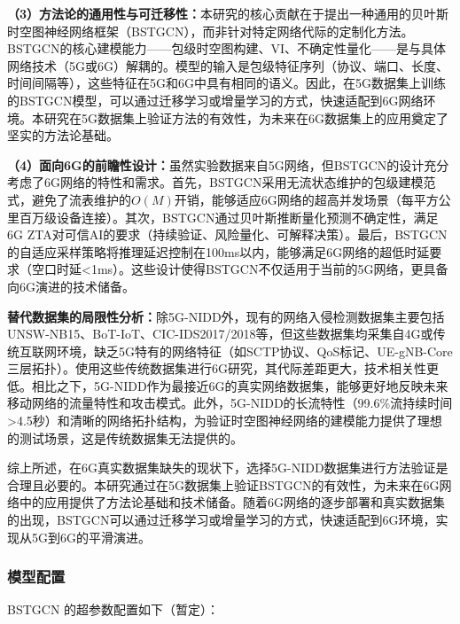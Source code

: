 \textbf{（3）方法论的通用性与可迁移性：}本研究的核心贡献在于提出一种通用的贝叶斯时空图神经网络框架（BSTGCN），而非针对特定网络代际的定制化方法。BSTGCN的核心建模能力——包级时空图构建、VI、不确定性量化——是与具体网络技术（5G或6G）解耦的。模型的输入是包级特征序列（协议、端口、长度、时间间隔等），这些特征在5G和6G中具有相同的语义。因此，在5G数据集上训练的BSTGCN模型，可以通过迁移学习或增量学习的方式，快速适配到6G网络环境。本研究在5G数据集上验证方法的有效性，为未来在6G数据集上的应用奠定了坚实的方法论基础。

\textbf{（4）面向6G的前瞻性设计：}虽然实验数据来自5G网络，但BSTGCN的设计充分考虑了6G网络的特性和需求。首先，BSTGCN采用无流状态维护的包级建模范式，避免了流表维护的$O(M)$开销，能够适应6G网络的超高并发场景（每平方公里百万级设备连接）。其次，BSTGCN通过贝叶斯推断量化预测不确定性，满足6G ZTA对可信AI的要求（持续验证、风险量化、可解释决策）。最后，BSTGCN的自适应采样策略将推理延迟控制在100ms以内，能够满足6G网络的超低时延要求（空口时延<1ms）。这些设计使得BSTGCN不仅适用于当前的5G网络，更具备向6G演进的技术储备。

\textbf{替代数据集的局限性分析：}除5G-NIDD外，现有的网络入侵检测数据集主要包括UNSW-NB15、BoT-IoT、CIC-IDS2017/2018等，但这些数据集均采集自4G或传统互联网环境，缺乏5G特有的网络特征（如SCTP协议、QoS标记、UE-gNB-Core三层拓扑）。使用这些传统数据集进行6G研究，其代际差距更大，技术相关性更低。相比之下，5G-NIDD作为最接近6G的真实网络数据集，能够更好地反映未来移动网络的流量特性和攻击模式。此外，5G-NIDD的长流特性（99.6\%流持续时间>4.5秒）和清晰的网络拓扑结构，为验证时空图神经网络的建模能力提供了理想的测试场景，这是传统数据集无法提供的。

综上所述，在6G真实数据集缺失的现状下，选择5G-NIDD数据集进行方法验证是合理且必要的。本研究通过在5G数据集上验证BSTGCN的有效性，为未来在6G网络中的应用提供了方法论基础和技术储备。随着6G网络的逐步部署和真实数据集的出现，BSTGCN可以通过迁移学习或增量学习的方式，快速适配到6G环境，实现从5G到6G的平滑演进。

\subsubsection{模型配置}

BSTGCN 的超参数配置如下（暂定）：


